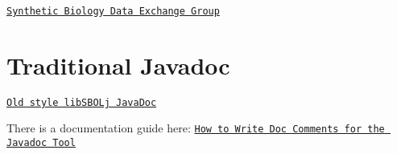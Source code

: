 \begin{DoxyItemize}
\item \href{http://groups.google.com/group/synbiodex/}{\tt Synthetic Biology Data Exchange Group}
\end{DoxyItemize}\hypertarget{index_javadoc_old}{}\section{Traditional Javadoc}\label{index_javadoc_old}

\begin{DoxyItemize}
\item \href{javadoc}{\tt Old style libSBOLj JavaDoc}
\item There is a documentation guide here: \href{http://www.oracle.com/technetwork/java/javase/documentation/index-137868.html}{\tt How to Write Doc Comments for the Javadoc Tool} 
\end{DoxyItemize}
